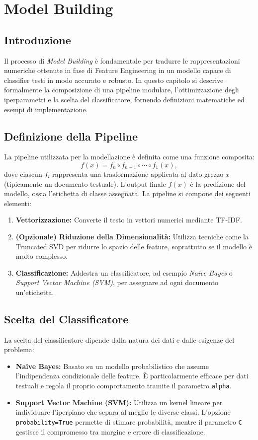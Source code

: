 
\chapter{Model Building}

\section{Introduzione}
Il processo di \emph{Model Building} è fondamentale per tradurre le rappresentazioni numeriche ottenute in fase di Feature Engineering in un modello capace di classifier testi in modo accurato e robusto. In questo capitolo si descrive formalmente la composizione di una pipeline modulare, l'ottimizzazione degli iperparametri e la scelta del classificatore, fornendo definizioni matematiche ed esempi di implementazione.

\section{Definizione della Pipeline}
La pipeline utilizzata per la modellazione è definita come una funzione composita:
\[
f(x) = f_n \circ f_{n-1} \circ \cdots \circ f_1(x),
\]
dove ciascun \( f_i \) rappresenta una trasformazione applicata al dato grezzo \( x \) (tipicamente un documento testuale). L'output finale \( f(x) \) è la predizione del modello, ossia l'etichetta di classe assegnata.
La pipeline si compone dei seguenti elementi:
\begin{enumerate}
  \item \textbf{Vettorizzazione:} Converte il testo in vettori numerici mediante TF-IDF.
  \item \textbf{(Opzionale) Riduzione della Dimensionalità:} Utilizza tecniche come la Truncated SVD per ridurre lo spazio delle feature, soprattutto se il modello è molto complesso.
  \item \textbf{Classificazione:} Addestra un classificatore, ad esempio \emph{Naive Bayes} o \emph{Support Vector Machine (SVM)}, per assegnare ad ogni documento un'etichetta.
\end{enumerate}

\section{Scelta del Classificatore}
La scelta del classificatore dipende dalla natura dei dati e dalle esigenze del problema:
\begin{itemize}
  \item \textbf{Naive Bayes:} Basato su un modello probabilistico che assume l'indipendenza condizionale delle feature. È particolarmente efficace per dati testuali e regola il proprio comportamento tramite il parametro \texttt{alpha}.
  \item \textbf{Support Vector Machine (SVM):} Utilizza un kernel lineare per individuare l'iperpiano che separa al meglio le diverse classi. L'opzione \texttt{probability=True} permette di stimare probabilità, mentre il parametro \texttt{C} gestisce il compromesso tra margine e errore di classificazione.
\end{itemize}

